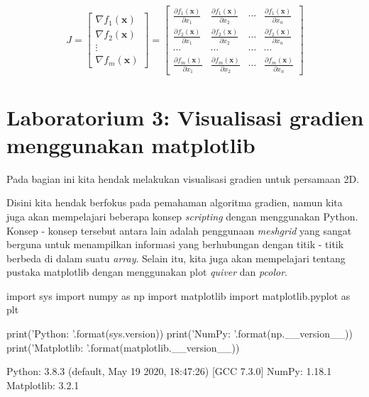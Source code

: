 \begin{equation}\label{eqn:eqn34}
J = \begin{bmatrix} \nabla f_{1}(\mathbf{x})\\\nabla f_{2}(\mathbf{x})\\ \vdots \\ \nabla f_{m}(\mathbf{x})\end{bmatrix} = \begin{bmatrix} \frac{\partial f_{1}(\mathbf{x})}{\partial x_{1}} & \frac{\partial f_{1}(\mathbf{x})}{\partial x_{2}} & \cdots & \frac{\partial f_{1}(\mathbf{x})}{\partial x_{n}}\\ \frac{\partial f_{2}(\mathbf{x})}{\partial x_{1}} & \frac{\partial f_{2}(\mathbf{x})}{\partial x_{2}} & \cdots & \frac{\partial f_{2}(\mathbf{x})}{\partial x_{n}}\\ \cdots & \cdots & \cdots & \cdots\\\frac{\partial f_{m}(\mathbf{x})}{\partial x_{1}} & \frac{\partial f_{m}(\mathbf{x})}{\partial x_{2}} & \cdots & \frac{\partial f_{m}(\mathbf{x})}{\partial x_{n}}\end{bmatrix}
\end{equation}

\section{Laboratorium 3: Visualisasi gradien menggunakan matplotlib}
Pada bagian ini kita hendak melakukan visualisasi gradien untuk persamaan 2D.

Disini kita hendak berfokus pada pemahaman algoritma gradien, namun kita juga akan mempelajari beberapa konsep \textit{scripting} dengan menggunakan Python. Konsep - konsep tersebut antara lain adalah penggunaan \textit{meshgrid} yang sangat berguna untuk menampilkan informasi yang berhubungan dengan titik - titik berbeda di dalam suatu \textit{array}. Selain itu, kita juga akan mempelajari tentang pustaka matplotlib dengan menggunakan plot \textit{quiver} dan \textit{pcolor}.

\begin{pyin}
import sys
import numpy as np
import matplotlib
import matplotlib.pyplot as plt

print('Python: {}'.format(sys.version))
print('NumPy: {}'.format(np.__version__))
print('Matplotlib: {}'.format(matplotlib.__version__))
\end{pyin}

\begin{pyout}
Python: 3.8.3 (default, May 19 2020, 18:47:26) 
[GCC 7.3.0]
NumPy: 1.18.1
Matplotlib: 3.2.1
\end{pyout}

